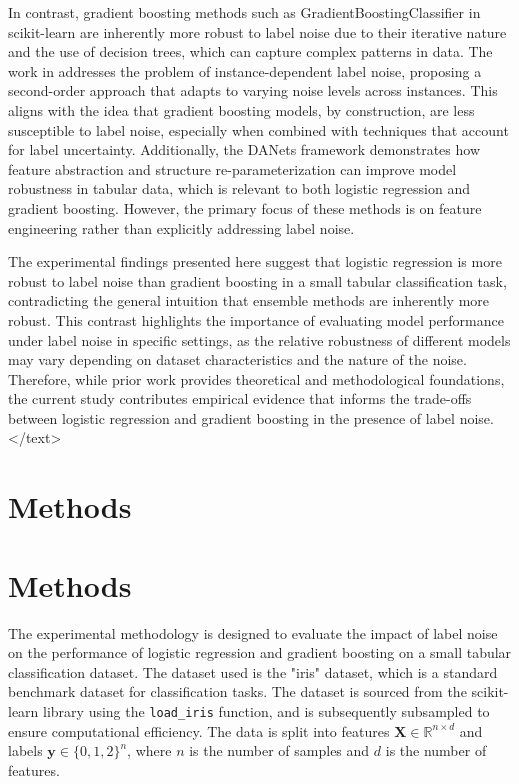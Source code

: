\documentclass{article}
\begin{document}
In contrast, gradient boosting methods such as GradientBoostingClassifier in scikit-learn are inherently more robust to label noise due to their iterative nature and the use of decision trees, which can capture complex patterns in data. The work in \cite{2012.11854v2} addresses the problem of instance-dependent label noise, proposing a second-order approach that adapts to varying noise levels across instances. This aligns with the idea that gradient boosting models, by construction, are less susceptible to label noise, especially when combined with techniques that account for label uncertainty. Additionally, the DANets framework \cite{2112.02962v4} demonstrates how feature abstraction and structure re-parameterization can improve model robustness in tabular data, which is relevant to both logistic regression and gradient boosting. However, the primary focus of these methods is on feature engineering rather than explicitly addressing label noise.

The experimental findings presented here suggest that logistic regression is more robust to label noise than gradient boosting in a small tabular classification task, contradicting the general intuition that ensemble methods are inherently more robust. This contrast highlights the importance of evaluating model performance under label noise in specific settings, as the relative robustness of different models may vary depending on dataset characteristics and the nature of the noise. Therefore, while prior work provides theoretical and methodological foundations, the current study contributes empirical evidence that informs the trade-offs between logistic regression and gradient boosting in the presence of label noise.
</text>
\section{Methods}
\section{Methods}

The experimental methodology is designed to evaluate the impact of label noise on the performance of logistic regression and gradient boosting on a small tabular classification dataset. The dataset used is the "iris" dataset, which is a standard benchmark dataset for classification tasks. The dataset is sourced from the scikit-learn library using the \texttt{load\_iris} function, and is subsequently subsampled to ensure computational efficiency. The data is split into features $ \mathbf{X} \in \mathbb{R}^{n \times d} $ and labels $ \mathbf{y} \in \{0, 1, 2\}^n $, where $ n $ is the number of samples and $ d $ is the number of features.
\end{document}
